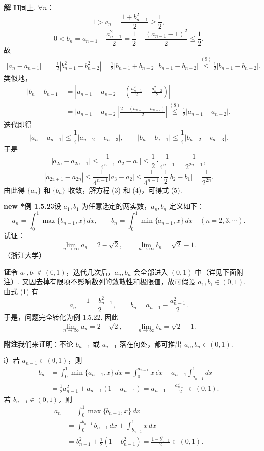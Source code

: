 \documentclass[UTF8, 12pt, fontset=fandol, oneside]{ctexart}
\begin{document}
\noindent\textbf{解 II}\quad 同上. $\forall n$：
\[
  1>a_n=\frac{1+b_{n-1}^2}{2}\ge \frac12,
\tag{8}
\]
\[
  0<b_n=a_{n-1}-\frac{a_{n-1}^2}{2}
  =\frac12-\frac{(a_{n-1}-1)^2}{2}\le \frac12.
\tag{9}
\]
故
\[
\begin{aligned}
  |a_n-a_{n-1}|
  &=\frac12|b_{n-1}^2-b_{n-2}^2|
   =\frac12|b_{n-1}+b_{n-2}|\,|b_{n-1}-b_{n-2}|
   \stackrel{(9)}{\le}\frac12|b_{n-1}-b_{n-2}|.
\end{aligned}
\]
类似地，
\[
\begin{aligned}
  |b_n-b_{n-1}|
  &=\left|a_{n-1}-a_{n-2}
    -\left(\frac{a_{n-1}^2}{2}-\frac{a_{n-2}^2}{2}\right)\right|\\
  &=|a_{n-1}-a_{n-2}|
    \left|\frac{2-(a_{n-1}+a_{n-2})}{2}\right|
   \stackrel{(8)}{\le}\frac12|a_{n-1}-a_{n-2}|.
\end{aligned}
\]
迭代即得
\[
  |a_n-a_{n-1}|\le \frac14|a_{n-2}-a_{n-3}|,\qquad
  |b_n-b_{n-1}|\le \frac14|b_{n-2}-b_{n-3}|.
\]
于是
\[
  |a_{2n}-a_{2n-1}|
  \le \frac1{4^{n-1}}|a_2-a_1|
  \le \frac12\cdot \frac1{4^{n-1}}
  =\frac1{2^{2n-1}},
\]
\[
  |a_{2n+1}-a_{2n}|
  \le \frac1{4^{n-1}}|a_3-a_2|
  \le \frac1{4^{n-1}}\cdot \frac12|b_2-b_1|
  =\frac1{2^{2n}}.
\]
由此得 $\{a_n\}$ 和 $\{b_n\}$ 收敛，解方程 (3) 和 (4)，可得式 (5).

\noindent\textbf{new *例 1.5.23}\quad 设 $a_1,b_1$ 为任意选定的两实数，$a_n,b_n$ 定义如下：
\[
  a_n=\int_0^1 \max\{b_{n-1},x\}\,dx,\qquad
  b_n=\int_0^1 \min\{a_{n-1},x\}\,dx\quad (n=2,3,\cdots).
\tag{1}
\]
试证：
\[
  \lim_{n\to\infty}a_n=2-\sqrt2,\qquad
  \lim_{n\to\infty}b_n=\sqrt2-1.
\]
（浙江大学）

\noindent\textbf{证}\quad 令 $a_1,b_1\notin (0,1)$，迭代几次后，$a_n,b_n$ 会全部进入 $(0,1)$ 中（详见下面附注）. 又因去掉有限项不影响数列的敛散性和极限值，故可假设 $a_1,b_1\in (0,1)$. 由式 (1) 有
\[
  a_n=\frac{1+b_{n-1}^2}{2},\qquad
  b_n=a_{n-1}-\frac{a_{n-1}^2}{2}.
\tag{2}
\]
于是，问题完全转化为例 1.5.22. 因此
\[
  \lim_{n\to\infty}a_n=2-\sqrt2,\qquad
  \lim_{n\to\infty}b_n=\sqrt2-1.
\]

\noindent\textbf{附注}\quad 我们来证明：不论 $b_{n-1}$ 或 $a_{n-1}$ 落在何处，都可推出 $a_n,b_n\in (0,1)$.

i）若 $a_{n-1}\in (0,1)$，则
\[
\begin{aligned}
  b_n
  &=\int_0^1\min\{a_{n-1},x\}\,dx
   =\int_0^{a_{n-1}}x\,dx+a_{n-1}\int_{a_{n-1}}^1 dx\\
  &=\frac12a_{n-1}^2+a_{n-1}(1-a_{n-1})
   =a_{n-1}-\frac{a_{n-1}^2}{2}\in (0,1).
\end{aligned}
\]
若 $b_{n-1}\in (0,1)$，则
\[
\begin{aligned}
  a_n
  &=\int_0^1\max\{b_{n-1},x\}\,dx\\
  &=\int_0^{b_{n-1}}b_{n-1}\,dx+\int_{b_{n-1}}^1x\,dx\\
  &=b_{n-1}^2+\frac12(1-b_{n-1}^2)
   =\frac{1+b_{n-1}^2}{2}\in (0,1).
\end{aligned}
\]
\end{document}
